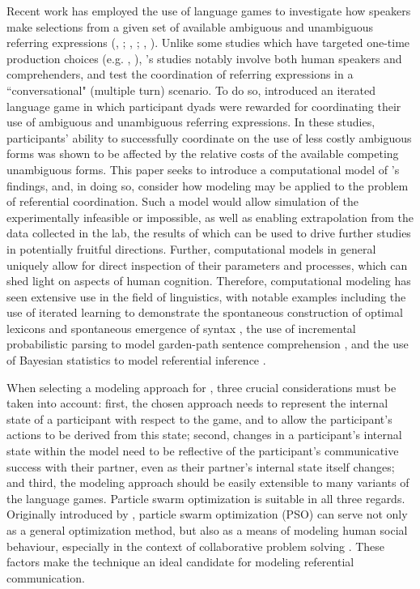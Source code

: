 \documentclass[12pt,a4paper]{article}
\begin{document}
Recent work has employed the use of language games to investigate how speakers make selections from a given set of available ambiguous and unambiguous referring expressions (\citeauthor{rohde2012}, \citeyear{rohde2012}; \citeauthor{degen2012}, \citeyear{degen2012}; \citeauthor{frank2012}, \citeyear{frank2012}). Unlike some studies which have targeted one-time production choices (e.g. \citeauthor{degen2012}, \citeyear{degen2012}), \citeauthor{rohde2012}'s studies notably involve both human speakers and comprehenders, and test the coordination of referring expressions in a ``conversational" (multiple turn) scenario. To do so, \citeauthor{rohde2012} introduced an iterated language game in which participant dyads were rewarded for coordinating their use of ambiguous and unambiguous referring expressions. In these studies, participants' ability to successfully coordinate on the use of less costly ambiguous forms was shown to be affected by the relative costs of the available competing unambiguous forms. This paper seeks to introduce a computational model of \citeauthor{rohde2012}'s findings, and, in doing so, consider how modeling may be applied to the problem of referential coordination. Such a model would allow simulation of the experimentally infeasible or impossible, as well as enabling extrapolation from the data collected in the lab, the results of which can be used to drive further studies in potentially fruitful directions. Further, computational models in general uniquely allow for direct inspection of their parameters and processes, which can shed light on aspects of human cognition. Therefore, computational modeling has seen extensive use in the field of linguistics, with notable examples including the use of iterated learning to demonstrate the spontaneous construction of optimal lexicons \citep{smith2002} and spontaneous emergence of syntax \citep{kirby2002}, the use of incremental probabilistic parsing to model garden-path sentence comprehension \citep{hale2001}, and the use of Bayesian statistics to model referential inference \citep{frank2012}.

When selecting a modeling approach for \cite{rohde2012}, three crucial considerations must be taken into account: first, the chosen approach needs to represent the internal state of a participant with respect to the game, and to allow the participant's actions to be derived from this state; second, changes in a participant's internal state within the model need to be reflective of the participant's communicative success with their partner, even as their partner's internal state itself changes; and third, the modeling approach should be easily extensible to many variants of the \citeauthor{rohde2012} language games. Particle swarm optimization is suitable in all three regards. Originally introduced by \citet*{kennedy1995}, particle swarm optimization (PSO) can serve not only as a general optimization method, but also as a means of modeling human social behaviour, especially in the context of collaborative problem solving \citep{kennedy1997}. These factors make the technique an ideal candidate for modeling referential communication. 
\end{document}
